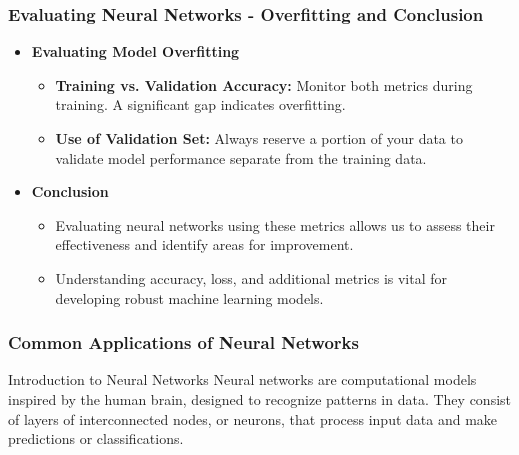 \documentclass[aspectratio=169]{beamer}
\begin{document}
\begin{frame}[fragile]
    \frametitle{Evaluating Neural Networks - Overfitting and Conclusion}
    \begin{itemize}
        \item \textbf{Evaluating Model Overfitting}
        \begin{itemize}
            \item \textbf{Training vs. Validation Accuracy:} Monitor both metrics during training. A significant gap indicates overfitting.
            \item \textbf{Use of Validation Set:} Always reserve a portion of your data to validate model performance separate from the training data.
        \end{itemize}

        \item \textbf{Conclusion}
        \begin{itemize}
            \item Evaluating neural networks using these metrics allows us to assess their effectiveness and identify areas for improvement.
            \item Understanding accuracy, loss, and additional metrics is vital for developing robust machine learning models.
        \end{itemize}
    \end{itemize}
\end{frame}

\begin{frame}[fragile]
    \frametitle{Common Applications of Neural Networks}
    
    \begin{block}{Introduction to Neural Networks}
        Neural networks are computational models inspired by the human brain, designed to recognize patterns in data.
        They consist of layers of interconnected nodes, or neurons, that process input data and make predictions or classifications.
    \end{block}
\end{frame}
\end{document}
